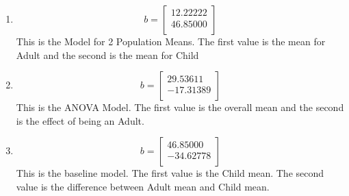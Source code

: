 \documentclass[10pt]{article}
\newenvironment{answer}[2][Answer]{\begin{trivlist}
\item[\hskip \labelsep {\bfseries #1}\hskip \labelsep {\bfseries #2.}]}{\end{trivlist}}
\begin{document}
\begin{answer}{11}
$ $\newline
    \begin{enumerate}
        \item \[b = 
\begin{bmatrix}
    12.22222 \\
    46.85000 \\
\end{bmatrix}
            \]
            This is the Model for 2 Population Means. The first value is the mean for Adult and the second is the mean for Child
        \item \[b = 
\begin{bmatrix}
    29.53611 \\
    -17.31389 \\
\end{bmatrix}
            \]
            This is the ANOVA Model. The first value is the overall mean and the second is the effect of being an Adult.
        \item \[b = 
\begin{bmatrix}
    46.85000 \\
    -34.62778 \\
\end{bmatrix}
            \]
            This is the baseline model. The first value is the Child mean. The second value is the difference between Adult mean and Child mean.
    \end{enumerate}
\end{answer}
\end{document}
